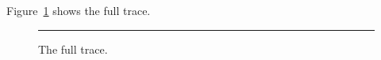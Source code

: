 \documentclass{article}
\begin{document}
Figure~\ref{fig:tall} shows the full trace.
\begin{figure}
  \centering
  \rule{4cm}{30cm}
  \caption{The full trace.}
  \label{fig:tall}
\end{figure}
\end{document}
